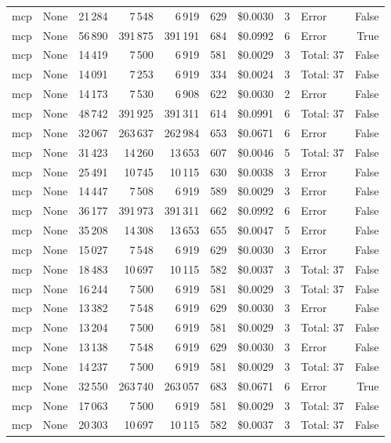 \documentclass[a4paper,11pt]{article}
\begin{document}
\begin{table}[H]
{\begin{tabular}{l r r r r r r r l r}
mcp & None & 21\,284 & 7\,548 & 6\,919 & 629 & \$0.0030 & 3 & Error & False \\
mcp & None & 56\,890 & 391\,875 & 391\,191 & 684 & \$0.0992 & 6 & Error & True \\
mcp & None & 14\,419 & 7\,500 & 6\,919 & 581 & \$0.0029 & 3 & Total: 37 & False \\
mcp & None & 14\,091 & 7\,253 & 6\,919 & 334 & \$0.0024 & 3 & Total: 37 & False \\
mcp & None & 14\,173 & 7\,530 & 6\,908 & 622 & \$0.0030 & 2 & Error & False \\
mcp & None & 48\,742 & 391\,925 & 391\,311 & 614 & \$0.0991 & 6 & Total: 37 & False \\
mcp & None & 32\,067 & 263\,637 & 262\,984 & 653 & \$0.0671 & 6 & Error & False \\
mcp & None & 31\,423 & 14\,260 & 13\,653 & 607 & \$0.0046 & 5 & Total: 37 & False \\
mcp & None & 25\,491 & 10\,745 & 10\,115 & 630 & \$0.0038 & 3 & Error & False \\
mcp & None & 14\,447 & 7\,508 & 6\,919 & 589 & \$0.0029 & 3 & Error & False \\
mcp & None & 36\,177 & 391\,973 & 391\,311 & 662 & \$0.0992 & 6 & Error & False \\
mcp & None & 35\,208 & 14\,308 & 13\,653 & 655 & \$0.0047 & 5 & Error & False \\
mcp & None & 15\,027 & 7\,548 & 6\,919 & 629 & \$0.0030 & 3 & Error & False \\
mcp & None & 18\,483 & 10\,697 & 10\,115 & 582 & \$0.0037 & 3 & Total: 37 & False \\
mcp & None & 16\,244 & 7\,500 & 6\,919 & 581 & \$0.0029 & 3 & Total: 37 & False \\
mcp & None & 13\,382 & 7\,548 & 6\,919 & 629 & \$0.0030 & 3 & Error & False \\
mcp & None & 13\,204 & 7\,500 & 6\,919 & 581 & \$0.0029 & 3 & Total: 37 & False \\
mcp & None & 13\,138 & 7\,548 & 6\,919 & 629 & \$0.0030 & 3 & Error & False \\
mcp & None & 14\,237 & 7\,500 & 6\,919 & 581 & \$0.0029 & 3 & Total: 37 & False \\
mcp & None & 32\,550 & 263\,740 & 263\,057 & 683 & \$0.0671 & 6 & Error & True \\
mcp & None & 17\,063 & 7\,500 & 6\,919 & 581 & \$0.0029 & 3 & Total: 37 & False \\
mcp & None & 20\,303 & 10\,697 & 10\,115 & 582 & \$0.0037 & 3 & Total: 37 & False \\

\end{tabular}}
\end{table}
\end{document}
